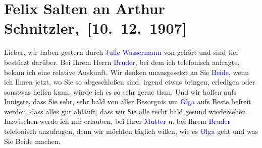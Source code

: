 

\renewcommand{\erwaehntePersonen}{Personen: Felix Salten, Olga Schnitzler, Julius Schnitzler, Louise Schnitzler, Julie Wassermann}
\renewcommand{\erwaehnteOrte}{Orte: Wien}
\renewcommand{\erwaehnteWerke}{}
\section[ Felix Salten an Arthur Schnitzler, {[}10. 12. 1907{]}]{Felix Salten an Arthur Schnitzler, {[}10. 12. 1907{]}}
\nopagebreak{}
\rehead{ }\normalsize\beginnumbering{}
\toendnotes[C]{\smallbreak\pagebreak[2]}
\toendnotes[C]{\smallbreak}
\pstart
           \noindent{}{\pb}Lieber, wir haben gestern durch \textcolor{blue}{Julie Wassermann}{}\ledrightnote{\textcolor{blue}{Julie Wassermann}} von \label{K_L03494-1v}\label{K_L03494-1h} gehört und sind tief bestürzt
               darüber. Bei Ihrem Herrn \textcolor{blue}{Bruder}{}\ledrightnote{{$\rightarrow$}\textcolor{blue}{Julius Schnitzler}}, bei dem ich telefonisch anfragte, bekam ich eine relative Auskunft.
               Wir denken unausgesetzt an Sie \textcolor{blue}{Beide}{}\ledrightnote{{$\rightarrow$}\textcolor{blue}{Olga Schnitzler}}, wenn ich Ihnen jetzt, wo Sie so abgeschloßen sind, irgend etwas
               bringen, erledigen oder sonstwas helfen kann, würde ich es so sehr gerne thun. Und
               wir hoffen aufs \uline{Innigste}, dass Sie sehr, sehr bald
               von aller Besorgnis um \textcolor{blue}{Olga}{}\ledrightnote{\textcolor{blue}{Olga Schnitzler}} aufs Beste befreit
               werden, dass alles gut abläuft, dass wir Sie alle recht bald gesund wiedersehen.
               Inzwischen werde ich mir erlauben, bei Ihrer \textcolor{blue}{Mutter}{}\ledrightnote{{$\rightarrow$}\textcolor{blue}{Louise Schnitzler}} u. bei Ihrem \textcolor{blue}{Bruder}{}\ledrightnote{{$\rightarrow$}\textcolor{blue}{Julius Schnitzler}} telefonisch anzufragen, denn wir möchten täglich
               wißen, wie es \textcolor{blue}{Olga}{}\ledrightnote{\textcolor{blue}{Olga Schnitzler}} geht und was Sie Beide
               machen.\pend
           
